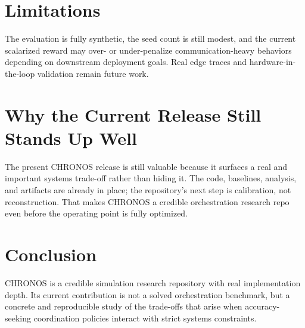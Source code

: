 \documentclass[conference]{IEEEtran}
\begin{document}
\section{Limitations}
The evaluation is fully synthetic, the seed count is still modest, and the current scalarized reward may over- or under-penalize communication-heavy behaviors depending on downstream deployment goals. Real edge traces and hardware-in-the-loop validation remain future work.

\section{Why the Current Release Still Stands Up Well}
The present CHRONOS release is still valuable because it surfaces a real and
important systems trade-off rather than hiding it. The code, baselines,
analysis, and artifacts are already in place; the repository's next step is
calibration, not reconstruction. That makes CHRONOS a credible orchestration
research repo even before the operating point is fully optimized.

\section{Conclusion}
CHRONOS is a credible simulation research repository with real implementation depth. Its current contribution is not a solved orchestration benchmark, but a concrete and reproducible study of the trade-offs that arise when accuracy-seeking coordination policies interact with strict systems constraints.



\end{document}
